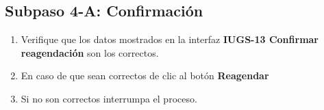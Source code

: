 \subsection{Subpaso 4-A: Confirmación}
\begin{enumerate}
	\item Verifique que los datos mostrados en la interfaz \textbf{IUGS-13 Confirmar reagendación} son los correctos.
	\item En caso de que sean correctos de clic al botón \textbf{Reagendar}
	\item Si no son correctos interrumpa el proceso.
\end{enumerate}